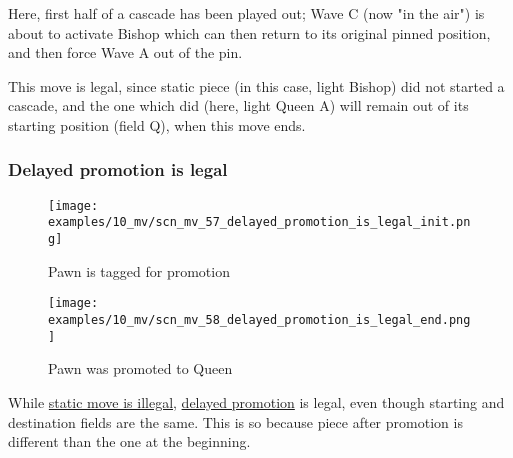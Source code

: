 \vspace*{-0.4\baselineskip}
Here, first half of a cascade has been played out; Wave C (now "in the air") is
about to activate Bishop which can then return to its original pinned position,
and then force Wave A out of the pin.

This move is legal, since static piece (in this case, light Bishop) did not started
a cascade, and the one which did (here, light Queen A) will remain out of its
starting position (field Q), when this move ends.

\clearpage %

\subsubsection*{Delayed promotion is legal}
\label{sec:Miranda's veil/Wave/Cascading Waves/Delayed promotion is legal}

\noindent
\begin{figure}[!h]
\texttt{[image: examples/10\_mv/scn\_mv\_57\_delayed\_promotion\_is\_legal\_init.png]}
\caption{Pawn is tagged for promotion}
\label{fig:scn_mv_57_delayed_promotion_is_legal_init}
\end{figure}

\noindent
\begin{figure}[!h]
\texttt{[image: examples/10\_mv/scn\_mv\_58\_delayed\_promotion\_is\_legal\_end.png]}
\caption{Pawn was promoted to Queen}
\label{fig:scn_mv_58_delayed_promotion_is_legal_end}
\end{figure}

While \hyperref[fig:scn_mv_53_static_move_is_illegal_init]{static move is illegal},
\hyperref[sec:Age of Aquarius/Promotion]{delayed promotion} is legal, even though
starting and destination fields are the same. This is so because piece after
promotion is different than the one at the beginning.

\clearpage %

